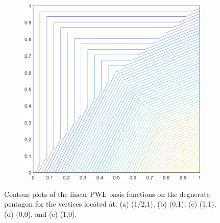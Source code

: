 \begin{figure}
\begin{subfigure}[b]{0.39\textwidth}
		\caption{}
	\end{subfigure}
	\hspace{1.5cm}
	\begin{subfigure}[b]{0.39\textwidth}
		\centering
		\includegraphics[width=\textwidth]{figures/sec_BF/deg_square_PWLD1_contour_b2.png}
		\caption{}
	\end{subfigure}
\caption{Contour plots of the linear PWL basis functions on the degnerate pentagon for the vertices located at: (a) (1/2,1), (b) (0,1), (c) (1,1), (d) (0,0), and (e) (1,0).}
\label{fig::2D_PWLD1_deg_square_basis_functions}
\end{figure}

